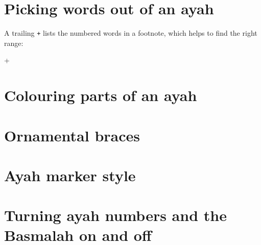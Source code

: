 \documentclass{article}
\begin{document}
\section{Picking words out of an ayah}
\begin{arab}[utf]
  \quranayah[2][156][6]

  \quranayah[2][286][31-43]

  \quranayah[18][19][34-34]   %
\end{arab}

A trailing \texttt{+} lists the numbered words in a footnote, which helps to
find the right range:
\begin{arab}[utf]
  \quranayah[Ar-Ra'd][23-24][10]+
\end{arab}

\section{Colouring parts of an ayah}
\begin{arab}[utf]
  \textcolor{green!50!black}{\quranayah[2][286][1-6]}
  \quranayah[2][286][7-30]
  \textcolor{red!70!black}{\quranayah[2][286][31-45]}
  \quranayah[2][286][46]
\end{arab}

\section{Ornamental braces}
\begin{arab}[utf]
  \quranayah*[112][1-2]

  \SetOrnamentalBraces{[[}{]]}
  \quranayah*[112][3-4]
\end{arab}

\section{Ayah marker style}
\begin{arab}[utf]
  \SetAyahMarkerStyle{(\textcolor{red}\bgroup}{\egroup)}
  \quranayah*[1][1-4]

  \ResetAyahMarkerStyle
  \quranayah*[1][5-7]
\end{arab}

\section{Turning ayah numbers and the Basmalah on and off}
\begin{arab}[utf]
  {\ToggleAyahNumber \quransurah*[103]}

  {\ToggleBasmalah   \quransurah*[103]}
\end{arab}
\end{document}
